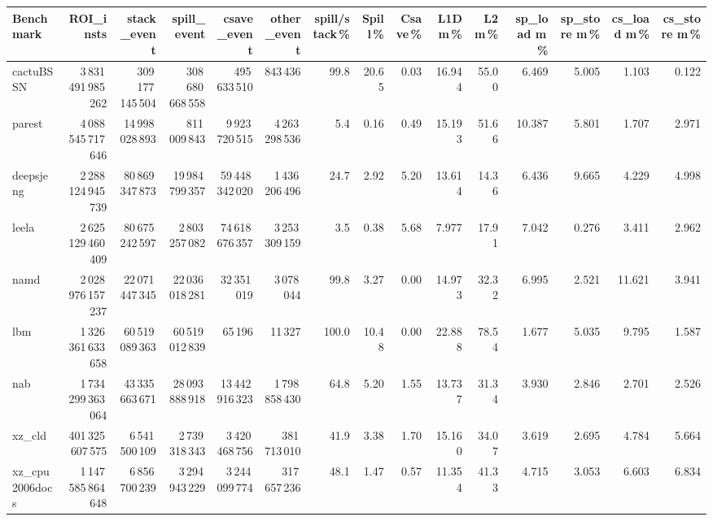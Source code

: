\documentclass[9pt,landscape,a4paper]{article}
\begin{document}
\vspace{2mm}
\centering
\begin{adjustbox}{max width=\textwidth, max totalheight=0.50\textheight}%
\begin{tabular}{lrrrrrrrrrrrrrr}
\toprule
Benchmark & ROI\_insts & stack\_event & \textbf{spill\_event} & csave\_event & other\_event & spill/stack\,\% & Spill\,\% & Csave\,\% & L1D m\,\% & L2 m\,\% & sp\_load m\,\% & sp\_store m\,\% & cs\_load m\,\% & cs\_store m\,\% \\
\midrule
cactuBSSN & 3\,831\,491\,985\,262 & 309\,177\,145\,504 & 308\,680\,668\,558 & 495\,633\,510 & 843\,436 & 99.8 & 20.65 & 0.03 & 16.944 & 55.00 & 6.469 & 5.005 & 1.103 & 0.122 \\
parest & 4\,088\,545\,717\,646 & 14\,998\,028\,893 & 811\,009\,843 & 9\,923\,720\,515 & 4\,263\,298\,536 & 5.4 & 0.16 & 0.49 & 15.193 & 51.66 & 10.387 & 5.801 & 1.707 & 2.971 \\
deepsjeng & 2\,288\,124\,945\,739 & 80\,869\,347\,873 & 19\,984\,799\,357 & 59\,448\,342\,020 & 1\,436\,206\,496 & 24.7 & 2.92 & 5.20 & 13.614 & 14.36 & 6.436 & 9.665 & 4.229 & 4.998 \\
leela & 2\,625\,129\,460\,409 & 80\,675\,242\,597 & 2\,803\,257\,082 & 74\,618\,676\,357 & 3\,253\,309\,159 & 3.5 & 0.38 & 5.68 & 7.977 & 17.91 & 7.042 & 0.276 & 3.411 & 2.962 \\
namd & 2\,028\,976\,157\,237 & 22\,071\,447\,345 & 22\,036\,018\,281 & 32\,351\,019 & 3\,078\,044 & 99.8 & 3.27 & 0.00 & 14.973 & 32.32 & 6.995 & 2.521 & 11.621 & 3.941 \\
lbm & 1\,326\,361\,633\,658 & 60\,519\,089\,363 & 60\,519\,012\,839 & 65\,196 & 11\,327 & 100.0 & 10.48 & 0.00 & 22.888 & 78.54 & 1.677 & 5.035 & 9.795 & 1.587 \\
nab & 1\,734\,299\,363\,064 & 43\,335\,663\,671 & 28\,093\,888\,918 & 13\,442\,916\,323 & 1\,798\,858\,430 & 64.8 & 5.20 & 1.55 & 13.737 & 31.34 & 3.930 & 2.846 & 2.701 & 2.526 \\
xz\_cld & 401\,325\,607\,575 & 6\,541\,500\,109 & 2\,739\,318\,343 & 3\,420\,468\,756 & 381\,713\,010 & 41.9 & 3.38 & 1.70 & 15.160 & 34.07 & 3.619 & 2.695 & 4.784 & 5.664 \\
xz\_cpu2006docs & 1\,147\,585\,864\,648 & 6\,856\,700\,239 & 3\,294\,943\,229 & 3\,244\,099\,774 & 317\,657\,236 & 48.1 & 1.47 & 0.57 & 11.354 & 41.33 & 4.715 & 3.053 & 6.603 & 6.834 \\

\end{tabular}
\end{adjustbox}
\end{document}
